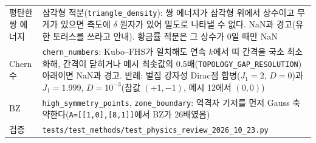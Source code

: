 \begin{tabularx}{\textwidth}{@{}P{3.0cm}Y@{}}
    평탄한 쌍 에너지 & 삼각형 적분(\texttt{triangle\_density}): 쌍 에너지가 삼각형 위에서 상수이고 무게가 있으면 측도에 $\delta$ 원자가 있어 밀도로 나타낼 수 없다. NaN과 경고(유한 토러스를 쓰라고 안내). 황금률 적분은 그 상수가 0일 때만 NaN \\
    Chern 수 & \texttt{chern\_numbers}: Kubo--FHS가 일치해도 연속 $k$에서 띠 간격을 국소 최소화해, 간격이 닫히거나 메시 최솟값의 0.5배(\texttt{TOPOLOGY\_GAP\_RESOLUTION}) 아래이면 NaN과 경고. 반례: 벌집 강자성 Dirac점 합병($J_1=2$, $D=0$)과 $J_1=1.999$, $D=10^{-3}$(참값 $(+1,-1)$, 메시 12에서 $(0,0)$) \\
    BZ & \texttt{high\_symmetry\_points}, \texttt{zone\_boundary}: 역격자 기저를 먼저 Gauss 축약한다(\texttt{A=[[1,0],[8,1]]}에서 BZ가 26배였음) \\
    검증 & \texttt{tests/test\_methods/test\_physics\_review\_2026\_10\_23.py} \\
    \bottomrule
  \end{tabularx}
\endgroup

